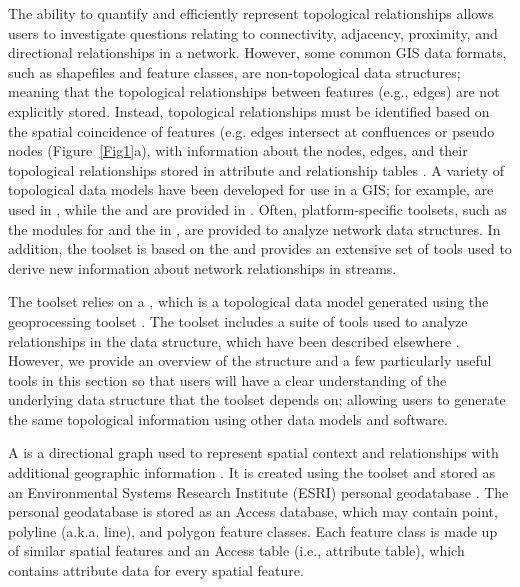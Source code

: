 \documentclass[article]{jss}
\begin{document}
The ability to quantify and efficiently represent topological
relationships allows users to investigate questions relating to
connectivity, adjacency, proximity, and directional relationships in a
network. However, some common GIS data formats, such as shapefiles and
feature classes, are non-topological data structures; meaning that the
topological relationships between features (e.g., edges) are not
explicitly stored. Instead, topological relationships must be
identified based on the spatial coincidence of features (e.g. edges
intersect at confluences or pseudo nodes (Figure~\ref{Fig1}a), with information
about the nodes, edges, and their topological relationships stored in
attribute and relationship tables \citep{Fish:GIS:2004}. A variety of
topological data models have been developed for use in a GIS; for
example,  are used in  \citep{Nete:Mita:open:2008}, while the  and  are provided in
 \citep{ESRI:ArcG:2009}. Often, platform-specific toolsets, such as the
 modules for  and the  in , are
provided to analyze network data structures. In addition, the 
 toolset \citep{Maid:ArcH:2002} is based on the  and
provides an extensive set of tools used to derive new information
about network relationships in streams.

The  toolset relies on a , which is a
topological data model generated using the   geoprocessing
toolset \citep{Theo:Norm:Pete:Ferr:Wade:func:2006}.  The  toolset includes a suite of
tools used to analyze relationships in the  data structure, which
have been described elsewhere \citep{Theo:Norm:Pete:Ferr:func:2005,Theo:Norm:Pete:Ferr:Wade:func:2006}. However, we provide an overview of the  structure and a
few particularly useful tools in this section so that users will have
a clear understanding of the underlying data structure that the 
toolset depends on; allowing users to generate the same topological
information using other data models and software.

A  is a directional graph used to represent
spatial context and relationships with additional geographic
information \citep{Theo:Norm:Pete:Ferr:Wade:func:2006}. It is created
using the  toolset and stored as an Environmental Systems
Research Institute (ESRI)  personal geodatabase \citep{ESRI:ArcG:2009}. The personal geodatabase is stored as an Access database, which may contain point, polyline (a.k.a. line), and polygon feature classes. Each feature class is made up of similar spatial features and an Access table (i.e., attribute table), which contains attribute data for every spatial feature.
\end{document}
